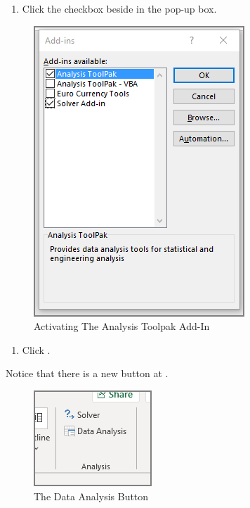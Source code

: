 \begin{enumerate}[resume]	
	
	\item Click the checkbox beside  in the  pop-up box.
	
\end{enumerate}

\begin{figure}[H]
	\centering
	\includegraphics[width=\maxwidth{.95\linewidth}]{gfx/ch09_fig37}
	\caption{Activating The Analysis Toolpak Add-In}
	\label{09:fig37}
\end{figure}

\begin{enumerate}[resume]	
	\item Click .
\end{enumerate}

Notice that there is a new  button at .

\begin{figure}[H]
	\centering
	\includegraphics[width=\maxwidth{.95\linewidth}]{gfx/ch09_fig38}
	\caption{The Data Analysis Button}
	\label{09:fig38}
\end{figure}







